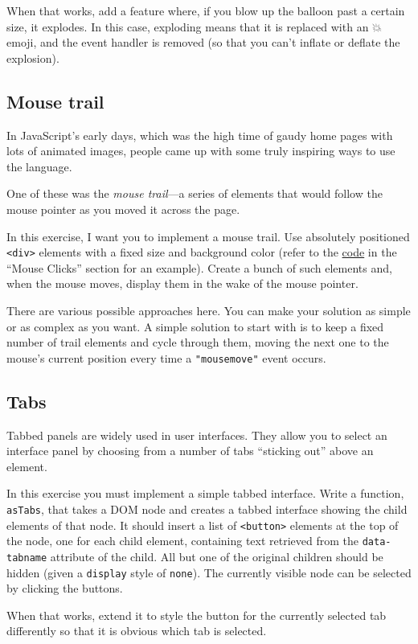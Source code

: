 When that works, add a feature where, if you blow up the balloon past a certain size, it explodes. In this case, exploding means that it is replaced with an 💥 emoji, and the event handler is removed (so that you can't inflate or deflate the explosion).

\subsection{Mouse trail}

In JavaScript's early days, which was the high time of gaudy home
pages with lots of animated images, people came up with some truly inspiring ways to use the language.

One of these was the \emph{mouse trail}—a series of elements that would follow the mouse pointer as you moved it across the page.

In this exercise, I want you to implement a mouse trail. Use absolutely positioned \lstinline`<div>` elements with a fixed size and background color (refer to the \hyperref[event.mouse_drawing]{code} in the ``Mouse Clicks'' section for an example). Create a bunch of such elements and, when the mouse moves, display them in the wake of the mouse pointer.

There are various possible approaches here. You can make your solution as simple or as complex as you want. A simple solution to start with is to keep a fixed number of trail elements and cycle through them, moving the next one to the mouse's current position every time a \lstinline`"mousemove"` event occurs.

\subsection{Tabs}

Tabbed panels are widely used in user interfaces. They allow you to select an interface panel by choosing from a number of tabs ``sticking out'' above an element.

In this exercise you must implement a simple tabbed interface. Write a function, \lstinline`asTabs`, that takes a DOM node and creates a tabbed interface showing the child elements of that node. It should insert a list of \lstinline`<button>` elements at the top of the node, one for each child element, containing text retrieved from the \lstinline`data-tabname` attribute of the child. All but one of the original children should be hidden (given a \lstinline`display` style of \lstinline`none`). The currently visible node can be selected by clicking the buttons.

When that works, extend it to style the button for the currently selected tab differently so that it is obvious which tab is selected.
